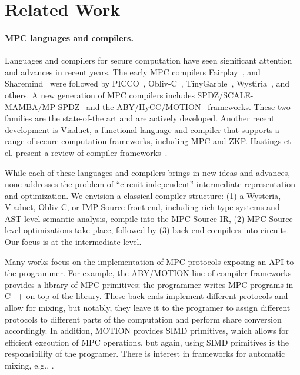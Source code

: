 \section{Related Work}
\label{sec:related}

\paragraph{MPC languages and compilers.}

Languages and compilers for secure computation have seen significant attention and advances in recent years. The early MPC compilers Fairplay~\cite{CCS:BenNisPin08},
and Sharemind~\cite{ESORICS:BogLauWil08} were followed by PICCO~\cite{CCS:ZhaSteBla13}, Obliv-C~\cite{Zahur:2015}, TinyGarble~\cite{SP:SHSSK15},
Wystiria~\cite{SP:RasHamHic14}, and others. A new generation of MPC compilers
includes SPDZ/SCALE-MAMBA/MP-SPDZ~\cite{Keller:2020} and the ABY/HyCC/MOTION~\cite{NDSS:DemSchZoh15,CCS:BDKKS18,Braun:2022} frameworks.
These two families are the state-of-the art and
are actively developed. Another recent development is Viaduct, a functional language and compiler that supports a range of secure computation
frameworks, including MPC and ZKP. Hastings et el. present a review of compiler frameworks~\cite{Hastings:2019}.

While each of these languages and compilers brings in new ideas and advances, none addresses the problem of ``circuit independent'' intermediate
representation and optimization. We envision a classical compiler structure: (1) a Wysteria, Viaduct, Obliv-C, or IMP Source front end, including rich type systems and
AST-level semantic analysis, compile into the MPC Source IR, (2) MPC Source-level optimizations take place, followed by (3) back-end compilers into circuits.
Our focus is at the intermediate level.


Many works focus on the implementation of MPC protocols exposing an API to the programmer. For example, the ABY/MOTION line of
compiler frameworks provides a library of MPC primitives; the programmer writes MPC programs in C++ on top of the library. These back ends implement
different protocols and allow for mixing, but notably, they leave it to the programer to assign different protocols to different parts of the
computation and perform share conversion accordingly. In addition, MOTION provides SIMD primitives, which allows for efficient execution
of MPC operations, but again, using SIMD primitives is the responsibility of the programer. There is interest in frameworks for automatic mixing,
e.g., \cite{CCS:BDKKS18,Ishaq:2019,Fang:2022}.

